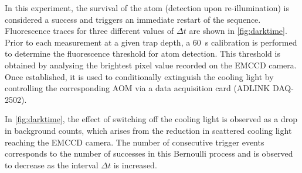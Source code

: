 \documentclass[../Thesis-IJspeert.tex]{subfiles}
\begin{document}
In this experiment, the survival of the atom (detection upon re-illumination) is considered a success and triggers an immediate restart of the sequence. Fluorescence traces for three different values of $\Delta t$ are shown in \autoref{fig:darktime}. Prior to each measurement at a given trap depth, a \SI{60}{\second} calibration is performed to determine the fluorescence threshold for atom detection. This threshold is obtained by analysing the brightest pixel value recorded on the EMCCD camera. Once established, it is used to conditionally extinguish the cooling light by controlling the corresponding AOM via a data acquisition card (ADLINK DAQ-2502).

In \autoref{fig:darktime}, the effect of switching off the cooling light is observed as a drop in background counts, which arises from the reduction in scattered cooling light reaching the EMCCD camera. The number of consecutive trigger events corresponds to the number of successes in this Bernoulli process and is observed to decrease as the interval $\Delta t$ is increased.
\end{document}
